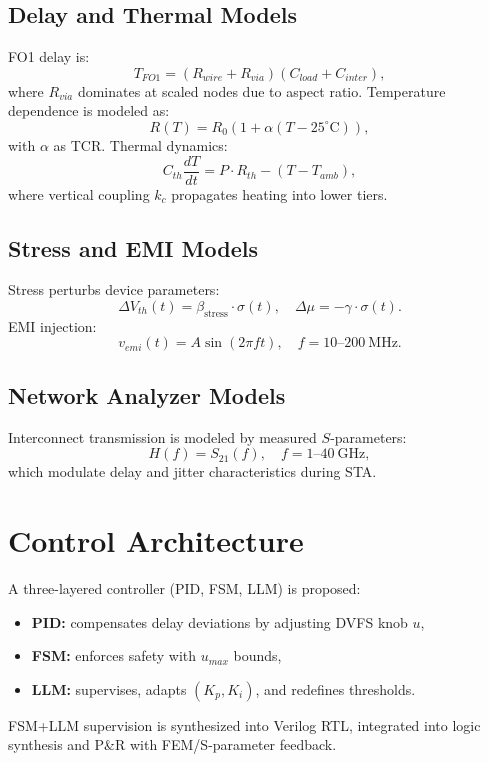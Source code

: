\documentclass[conference]{IEEEtran}
\begin{document}
\subsection{Delay and Thermal Models}
FO1 delay is:
\begin{equation}
T_{FO1} = (R_{wire}+R_{via})(C_{load}+C_{inter}),
\end{equation}
where $R_{via}$ dominates at scaled nodes due to aspect ratio.
Temperature dependence is modeled as:
\begin{equation}
R(T) = R_0 \left( 1 + \alpha (T-25^\circ \mathrm{C}) \right),
\end{equation}
with $\alpha$ as TCR.
Thermal dynamics:
\begin{equation}
C_{th}\frac{dT}{dt} = P \cdot R_{th} - (T - T_{amb}),
\end{equation}
where vertical coupling $k_c$ propagates heating into lower tiers.

\subsection{Stress and EMI Models}
Stress perturbs device parameters:
\begin{equation}
\Delta V_{th}(t) = \beta_{\mathrm{stress}} \cdot \sigma(t), \quad
\Delta \mu = -\gamma \cdot \sigma(t).
\end{equation}
EMI injection:
\begin{equation}
v_{emi}(t) = A \sin(2\pi f t), \quad f=10\text{--}200~\mathrm{MHz}.
\end{equation}

\subsection{Network Analyzer Models}
Interconnect transmission is modeled by measured $S$-parameters:
\begin{equation}
H(f) = S_{21}(f), \quad f=1\text{--}40~\mathrm{GHz},
\end{equation}
which modulate delay and jitter characteristics during STA.

\section{Control Architecture}
A three-layered controller (PID, FSM, LLM) is proposed:
\begin{itemize}
  \item \textbf{PID:} compensates delay deviations by adjusting DVFS knob $u$,
  \item \textbf{FSM:} enforces safety with $u_{max}$ bounds,
  \item \textbf{LLM:} supervises, adapts $(K_p,K_i)$, and redefines thresholds.
\end{itemize}
FSM+LLM supervision is synthesized into Verilog RTL,
integrated into logic synthesis and P\&R with FEM/S-parameter feedback.
\end{document}

